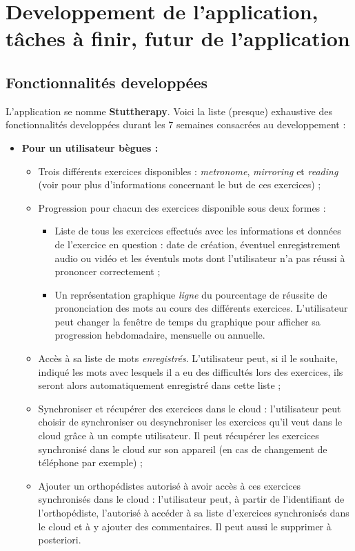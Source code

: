 \section{Developpement de l'application, tâches à finir, futur de l'application}

\subsection{Fonctionnalités developpées}
L'application se nomme \textbf{Stuttherapy}. Voici la liste (presque) exhaustive des fonctionnalités developpées durant les 7 semaines consacrées au developpement :

\begin{itemize}

  \item \textbf{Pour un utilisateur bègues :}
  \begin{itemize}
    \item Trois différents exercices disponibles : \textit{metronome}, \textit{mirroring} et \textit{reading} (voir  pour plus d'informations concernant le but de ces exercices) ;
    \item Progression pour chacun des exercices disponible sous deux formes :
    \begin{itemize}
      \item Liste de tous les exercices effectués avec les informations et données de l'exercice en question : date de création, éventuel enregistrement audio ou vidéo et les éventuls mots dont l'utilisateur n'a pas réussi à prononcer correctement ;
      \item Un représentation graphique \textit{ligne} du pourcentage de réussite de prononciation des mots au cours des différents exercices. L'utilisateur peut changer la fenêtre de temps du graphique pour afficher sa progression hebdomadaire, mensuelle ou annuelle.
    \end{itemize}
    \item Accès à sa liste de mots \textit{enregistrés}. L'utilisateur peut, si il le souhaite, indiqué les mots avec lesquels il a eu des difficultés lors des exercices, ils seront alors automatiquement enregistré dans cette liste ;
    \item Synchroniser et récupérer des exercices dans le cloud : l'utilisateur peut choisir de synchroniser ou desynchroniser les exercices qu'il veut dans le cloud grâce à un compte utilisateur. Il peut récupérer les exercices synchronisé dans le cloud sur son appareil (en cas de changement de téléphone par exemple) ;
    \item Ajouter un orthopédistes autorisé à avoir accès à ces exercices synchronisés dans le cloud : l'utilisateur peut, à partir de l'identifiant de l'orthopédiste, l'autorisé à accéder à sa liste d'exercices synchronisés dans le cloud et à y ajouter des commentaires. Il peut aussi le supprimer à posteriori.
  \end{itemize}


\end{itemize}
